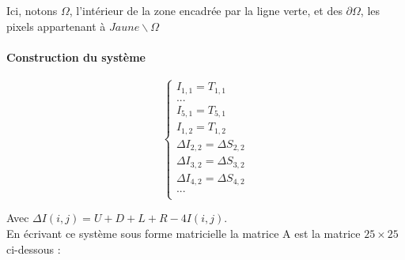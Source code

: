 Ici, notons $\Omega$, l'intérieur de la zone encadrée par la ligne verte, et des $\partial \Omega$, les pixels appartenant à $Jaune \backslash \Omega$


\paragraph{Construction du système}
\begin{center}
\begin{equation}
\left\{
\begin{aligned}
I_{1,1} = T_{1,1}\\
...\\
I_{5,1} = T_{5,1}\\
I_{1,2} = T_{1,2}\\
\Delta I_{2,2} = \Delta S_{2,2}\\
\Delta I_{3,2} = \Delta S_{3,2}\\
\Delta I_{4,2} = \Delta S_{4,2}\\
...\\
\end{aligned}
\right.
\end{equation}
\end{center}
\newpage
Avec $\Delta I(i,j) = U+D+L+R-4I(i,j)$.\\
En écrivant ce système sous forme matricielle la matrice A est la matrice $25\times 25$ ci-dessous :  

